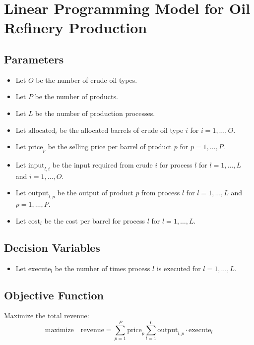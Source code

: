 \documentclass{article}
\begin{document}
\section*{Linear Programming Model for Oil Refinery Production}

\subsection*{Parameters}
\begin{itemize}
    \item Let \( O \) be the number of crude oil types.
    \item Let \( P \) be the number of products.
    \item Let \( L \) be the number of production processes.
    \item Let \( \text{allocated}_i \) be the allocated barrels of crude oil type \( i \) for \( i = 1, \ldots, O \).
    \item Let \( \text{price}_p \) be the selling price per barrel of product \( p \) for \( p = 1, \ldots, P \).
    \item Let \( \text{input}_{l,i} \) be the input required from crude \( i \) for process \( l \) for \( l = 1, \ldots, L \) and \( i = 1, \ldots, O \).
    \item Let \( \text{output}_{l,p} \) be the output of product \( p \) from process \( l \) for \( l = 1, \ldots, L \) and \( p = 1, \ldots, P \).
    \item Let \( \text{cost}_l \) be the cost per barrel for process \( l \) for \( l = 1, \ldots, L \).
\end{itemize}

\subsection*{Decision Variables}
\begin{itemize}
    \item Let \( \text{execute}_l \) be the number of times process \( l \) is executed for \( l = 1, \ldots, L \).
\end{itemize}

\subsection*{Objective Function}
Maximize the total revenue:
\[
\text{maximize} \quad \text{revenue} = \sum_{p=1}^{P} \text{price}_p \sum_{l=1}^{L} \text{output}_{l,p} \cdot \text{execute}_l
\]
\end{document}

